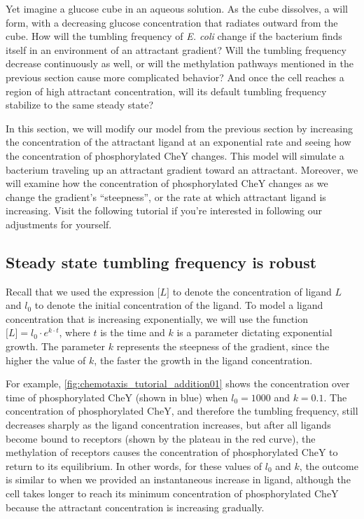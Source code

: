 Yet imagine a glucose cube in an aqueous solution. As the cube dissolves, a  will form, with a decreasing glucose concentration that radiates outward from the cube. How will the tumbling frequency of \textit{E. coli} change if the bacterium finds itself in an environment of an attractant gradient?  Will the tumbling frequency decrease continuously as well, or will the methylation pathways mentioned in the previous section cause more complicated behavior? And once the cell reaches a region of high attractant concentration, will its default tumbling frequency stabilize to the same steady state?

In this section, we will modify our model from the previous section by increasing the concentration of the attractant ligand at an exponential rate and seeing how the concentration of phosphorylated CheY changes. This model will simulate a bacterium traveling up an attractant gradient toward an attractant. Moreover, we will examine how the concentration of phosphorylated CheY changes as we change the gradient's ``steepness'', or the rate at which attractant ligand is increasing. Visit the following tutorial  if you're interested in following our adjustments for yourself.

\subsection{Steady state tumbling frequency is robust}

Recall that we used the expression $\text{[}L\text{]}$ to denote the concentration of ligand $L$ and $l_0$ to denote the initial concentration of the ligand. To model a ligand concentration that is increasing exponentially, we will use the function $\text{[}L\text{]} = l_0 \cdot e^{k \cdot t}$, where $t$ is the time and $k$ is a parameter dictating exponential growth. The parameter $k$ represents the steepness of the gradient, since the higher the value of $k$, the faster the growth in the ligand concentration.

For example, \autoref{fig:chemotaxis_tutorial_addition01} shows the concentration over time of phosphorylated CheY (shown in blue) when $l_0 = 1000$ and $k = 0.1$. The concentration of phosphorylated CheY, and therefore the tumbling frequency, still decreases sharply as the ligand concentration increases, but after all ligands become bound to receptors (shown by the plateau in the red curve), the methylation of receptors causes the concentration of phosphorylated CheY to return to its equilibrium. In other words, for these values of $l_0$ and $k$, the outcome is similar to when we provided an instantaneous increase in ligand, although the cell takes longer to reach its minimum concentration of phosphorylated CheY because the attractant concentration is increasing gradually.

